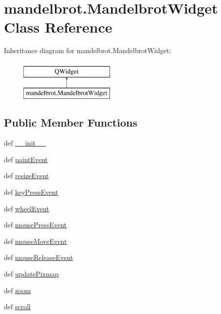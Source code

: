 \hypertarget{classmandelbrot_1_1MandelbrotWidget}{}\section{mandelbrot.\+Mandelbrot\+Widget Class Reference}
\label{classmandelbrot_1_1MandelbrotWidget}
Inheritance diagram for mandelbrot.\+Mandelbrot\+Widget\+:\begin{figure}[H]
\begin{center}
\leavevmode
\includegraphics[height=2.000000cm]{classmandelbrot_1_1MandelbrotWidget}
\end{center}
\end{figure}
\subsection*{Public Member Functions}
\begin{DoxyCompactItemize}
\item 
def \hyperlink{classmandelbrot_1_1MandelbrotWidget_a7c28eb7d7b3d9f8ff83fd27ed4c9dbcb}{\+\_\+\+\_\+init\+\_\+\+\_\+}
\item 
def \hyperlink{classmandelbrot_1_1MandelbrotWidget_aa00ea37d64e98051cdc2cbf6cef8d52b}{paint\+Event}
\item 
def \hyperlink{classmandelbrot_1_1MandelbrotWidget_a19618304114af727a098182e6aa48d5f}{resize\+Event}
\item 
def \hyperlink{classmandelbrot_1_1MandelbrotWidget_a00121d0bd8f4fbf6ee1dd4b810ea8fd5}{key\+Press\+Event}
\item 
def \hyperlink{classmandelbrot_1_1MandelbrotWidget_ab65ca0746bffd2ffbd1c7ceb0f4c9e18}{wheel\+Event}
\item 
def \hyperlink{classmandelbrot_1_1MandelbrotWidget_a9e05d3207bde77a66ae66f8236f130a9}{mouse\+Press\+Event}
\item 
def \hyperlink{classmandelbrot_1_1MandelbrotWidget_a989337e6afdee576d128239864a0463c}{mouse\+Move\+Event}
\item 
def \hyperlink{classmandelbrot_1_1MandelbrotWidget_a7721def4b3d57da00219babcedfe853f}{mouse\+Release\+Event}
\item 
def \hyperlink{classmandelbrot_1_1MandelbrotWidget_a9912b221775682773689c62fd12312cc}{update\+Pixmap}
\item 
def \hyperlink{classmandelbrot_1_1MandelbrotWidget_a562208a6d67b2010c87983f2fb7aa527}{zoom}
\item 
def \hyperlink{classmandelbrot_1_1MandelbrotWidget_a9a2b7313350cc8d32602d6e9db370b9a}{scroll}
\end{DoxyCompactItemize}
